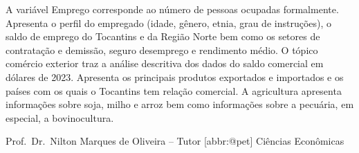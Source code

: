 \documentclass[
]{article}
\begin{document}
\begin{center}
\begin{minipage}{.7\linewidth}
A variável Emprego corresponde ao número de pessoas ocupadas
formalmente. Apresenta o perfil do empregado (idade, gênero, etnia, grau
de instruções), o saldo de emprego do Tocantins e da Região Norte bem
como os setores de contratação e demissão, seguro desemprego e
rendimento médio. O tópico comércio exterior traz a análise descritiva
dos dados do saldo comercial em dólares de 2023. Apresenta os principais
produtos exportados e importados e os países com os quais o Tocantins
tem relação comercial. A agricultura apresenta informações sobre soja,
milho e arroz bem como informações sobre a pecuária, em especial, a
bovinocultura.

\hfill\break
Prof.~Dr.~Nilton Marques de Oliveira -- Tutor {[}abbr:@pet{]} Ciências
Econômicas

\end{minipage}

\end{center}

\thispagestyle{empty}
\twocolumn
{}
\end{document}
